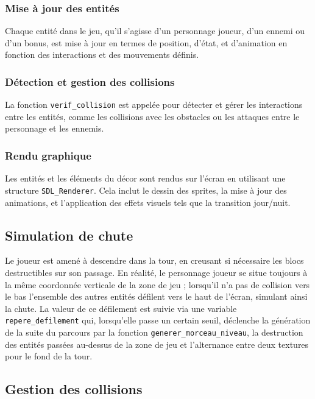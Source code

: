 \documentclass[a4paper,12pt]{article}
\begin{document}
\subsubsection{Mise à jour des entités}
Chaque entité dans le jeu, qu'il s'agisse d'un personnage joueur, d'un ennemi ou d'un bonus, est mise à jour en termes de position, d'état, et d'animation en fonction des interactions et des mouvements définis.
    
\subsubsection{Détection et gestion des collisions}
La fonction \texttt{verif\_collision} est appelée pour détecter et gérer les interactions entre les entités, comme les collisions avec les obstacles ou les attaques entre le personnage et les ennemis.
    
\subsubsection{Rendu graphique}
Les entités et les éléments du décor sont rendus sur l'écran en utilisant une structure \texttt{SDL\_Renderer}. Cela inclut le dessin des sprites, la mise à jour des animations, et l'application des effets visuels tels que la transition jour/nuit.

\subsection{Simulation de chute}

Le joueur est amené à descendre dans la tour, en creusant si nécessaire les blocs destructibles sur son passage.
En réalité, le personnage joueur se situe toujours à la même coordonnée verticale de la zone de jeu ; lorsqu’il n’a pas de collision vers le bas l’ensemble des autres entités défilent vers le haut de l’écran, simulant ainsi la chute.
La valeur de ce défilement est suivie via une variable \texttt{repere\_defilement} qui, lorsqu’elle passe un certain seuil, déclenche la génération de la suite du parcours par la fonction \texttt{generer\_morceau\_niveau}, la destruction des entités passées au-dessus de la zone de jeu et l’alternance entre deux textures pour le fond de la tour.

\subsection{Gestion des collisions}
\end{document}
